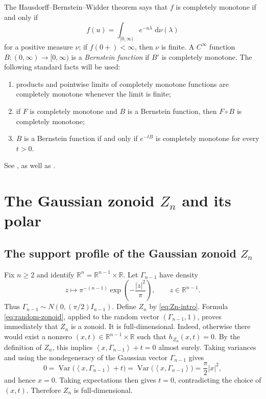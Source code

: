\documentclass[11pt]{article}
\theoremstyle{definition}
\theoremstyle{remark}
\newcommand{\R}{\mathbb R}
\newcommand{\dd}{\,\mathrm d}
\newcommand{\abs}[1]{\left|#1\right|}
\newcommand{\ip}[2]{\left\langle #1,#2\right\rangle}
\begin{document}
The Hausdorff--Bernstein--Widder theorem says that $f$ is completely
monotone if and only if
\begin{equation}\label{eq:HBW}
 f(u)=\int_{[0,\infty)}e^{-u\lambda}\,\dd\nu(\lambda)
\end{equation}
for a positive measure $\nu$; if $f(0+)<\infty$, then
$\nu$ is finite.  A $C^\infty$ function
$B:(0,\infty)\to[0,\infty)$ is a \emph{Bernstein function}
if $B'$ is completely monotone.  The following standard facts will be
used:
\begin{enumerate}[label=(\roman*)]
\item products and pointwise limits of completely monotone functions
      are completely monotone whenever the limit is finite;
\item if $F$ is completely monotone and $B$ is a Bernstein function,
      then $F\circ B$ is completely monotone;
\item $B$ is a Bernstein function if and only if $e^{-tB}$ is
      completely monotone for every $t>0$.
\end{enumerate}
See \cite[Theorem~1.4, Corollary~1.6, and
Theorem~3.7]{SchillingSongVondracek2012}, as well as
\cite[Chapter~IV]{Widder1941}.




\section{The  Gaussian zonoid \texorpdfstring{$Z_n$}{Z\_n} and its polar}
\label{sec:gaussian-zonoid}
\subsection{The support profile of the Gaussian zonoid \texorpdfstring{$Z_n$}{Z\_n}}
Fix $n\geq2$ and identify
$\R^n=\R^{n-1}\times\R$.  Let $\Gamma_{n-1}$ have density
\begin{equation}\label{eq:Gamma-density}
 z\longmapsto \pi^{-(n-1)}
 \exp\!\left(-\frac{\abs{z}^2}{\pi}\right),
 \qquad z\in\R^{n-1}.
\end{equation}
Thus $\Gamma_{n-1}\sim N(0,(\pi/2)I_{n-1})$.  Define $Z_n$ by
\eqref{eq:Zn-intro}.  Formula \eqref{eq:random-zonoid}, applied to the
random vector $(\Gamma_{n-1},1)$, proves immediately that $Z_n$ is a
zonoid. It is full-dimensional. Indeed, otherwise there would exist a nonzero
$(x,t)\in\R^{n-1}\times\R$ such that
$
h_{Z_n}(x,t)=0.
$
By the definition of $Z_n$, this implies
$
\ip{x}{\Gamma_{n-1}}+t=0$ 
almost surely.
Taking variances and using the nondegeneracy of the Gaussian vector
$\Gamma_{n-1}$ gives
\[
0=\operatorname{Var}\bigl(\ip{x}{\Gamma_{n-1}}+t\bigr)
  =\operatorname{Var}\bigl(\ip{x}{\Gamma_{n-1}}\bigr)
  =\frac{\pi}{2}|x|^2,
\]
and hence $x=0$. Taking expectations then gives $t=0$, contradicting
the choice of $(x,t)$. Therefore $Z_n$ is full-dimensional.
\end{document}
